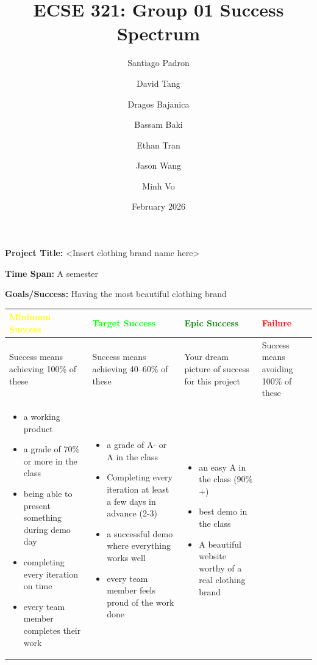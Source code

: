 \documentclass{article}
\title{ECSE 321: Group 01 Success Spectrum}
\author{Santiago Padron \and David Tang \and Dragos Bajanica \and Bassam Baki \and Ethan Tran \and Jason Wang \and Minh Vo}
\date{February 2026}
\begin{document}
\maketitle

\textbf{Project Title:} <Insert clothing brand name here>

\textbf{Time Span:} A semester

\textbf{Goals/Success:} Having the most beautiful clothing brand

\begin{center}
    \begin{tabular}{|p{5cm}|p{5cm}|p{5cm}|p{5cm}|}
        \hline
        \textbf{\textcolor{yellow}{Minimum Success}} & \textbf{\textcolor{lime}{Target Success}} & \textbf{\textcolor{green}{Epic Success}} & \textbf{\textcolor{red}{Failure}} \\
        \hline
        Success means achieving 100\% of these& Success means achieving 40–60\% of these & Your dream picture of success for this project & Success means avoiding 100\% of these \\
        \hline
        \begin{itemize}
            \item a working product
            \item a grade of 70\% or more in the class
            \item being able to present something during demo day
            \item completing every iteration on time
            \item every team member completes their work
        \end{itemize} & 
        \begin{itemize}
            \item a grade of A- or A in the class 
            \item Completing every iteration at least a few days in advance (2-3)
            \item a successful demo where everything works well
            \item every team member feels proud of the work done
        \end{itemize} & 
        \begin{itemize}
            \item an easy A in the class (90\% +)
            \item best demo in the class
            \item A beautiful website worthy of a real clothing brand

\end{itemize}
\end{tabular}
\end{center}
\end{document}
